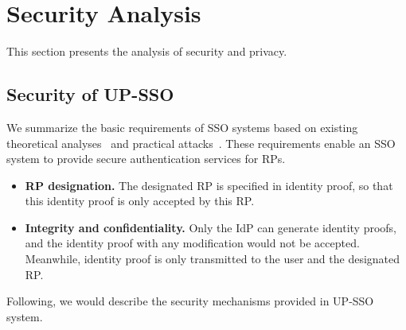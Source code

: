 \section{Security Analysis}
\label{sec:analysis}
This section presents the analysis of security and privacy. 

\subsection{Security of UP-SSO}
We summarize the basic requirements of SSO systems based on existing theoretical analyses~\cite{ArmandoCCCT08,FettKS16, FettKS17} and practical attacks~\cite{SomorovskyMSKJ12,WangCW12,ArmandoCCCPS13,WangZLG16,MainkaMS16,MainkaMSW17,YangLCZ18}. These requirements enable an SSO system to provide secure authentication services for RPs.
\begin{itemize}

\item
\textbf{RP designation.} The designated RP is specified in identity proof,
    so that this identity proof is  only accepted by this RP.


\item
\textbf{Integrity and confidentiality.}
 Only the IdP can generate identity proofs,
and the identity proof with any modification would not be accepted.
Meanwhile, identity proof is only transmitted to the user and the designated RP.
\end{itemize}


Following, we would describe the security mechanisms provided in UP-SSO system. 

